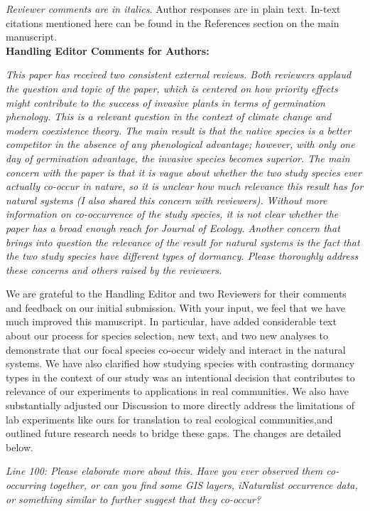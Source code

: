 \documentclass[11pt]{article}
\begin{document}
\emph{Reviewer comments are in italics.} Author responses are in plain text. In-text citations mentioned here can be found in the References section on the main manuscript.\\

\textbf{Handling Editor Comments for Authors:}

\emph{This paper has received two consistent external reviews. Both reviewers applaud the question and topic of the paper, which is centered on how priority effects might contribute to the success of invasive plants in terms of germination phenology. This is a relevant question in the context of climate change and modern coexistence theory. The main result is that the native species is a better competitor in the absence of any phenological advantage; however, with only one day of germination advantage, the invasive species becomes superior. The main concern with the paper is that it is vague about whether the two study species ever actually co-occur in nature, so it is unclear how much relevance this result has for natural systems (I also shared this concern with reviewers). Without more information on co-occurrence of the study species, it is not clear whether the paper has a broad enough reach for Journal of Ecology. Another concern that brings into question the relevance of the result for natural systems is the fact that the two study species have different types of dormancy. Please thoroughly address these concerns and others raised by the reviewers. }

We are grateful to the Handling Editor and two Reviewers for their comments and feedback on our initial submission. With your input, we feel that we have much improved this manuscript. In particular, have added considerable text about our process for species selection, new text, and two new analyses to demonstrate that our focal species co-occur widely and interact in the natural systems. We have also clarified how studying species with contrasting dormancy types in the context of our study was an intentional decision that contributes to relevance of our experiments to applications in real communities. We also have substantially adjusted our Discussion to more directly address the limitations of lab experiments like ours for translation to real ecological communities,and outlined future research needs to bridge these gaps. The changes are detailed below.

\emph{Line 100: Please elaborate more about this. Have you ever observed them co-occurring together, or can you find some GIS layers, iNaturalist occurrence data, or something similar to further suggest that they co-occur?} 
\end{document}
